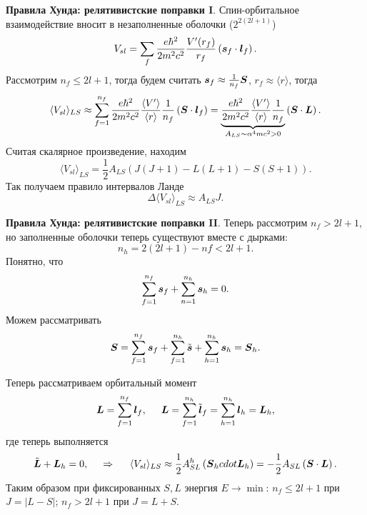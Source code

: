 \textbf{Правила Хунда: релятивистские поправки I}. Спин-орбитальное взаимодействие вносит в незаполненные оболочки ($2^{2(2l +1)}$) 
\begin{equation*}
	V_{sl} = \sum_f \frac{e \hbar^2}{2 m^2 c^2} \frac{V'(r_f)}{r_f} \left(
		\mbox{\boldmath $s$}_f \cdot \mbox{\boldmath $l$}_f
	\right).
\end{equation*}
Рассмотрим $n_f \leq 2 l +1$, тогда будем считать $\mbox{\boldmath $s$}_f \approx	\frac{1}{n_f} \mbox{\boldmath $S$}$, $r_f \approx \langle r\rangle$, тогда
\begin{equation*}
	\langle V_{sl}\rangle_{LS} \approx	
	\sum_{f=1}^{n_f} \frac{e \hbar^2}{2 m^2 c^2} \frac{\langle V'\rangle}{\langle r\rangle} \frac{1}{n_f} \left(\mbox{\boldmath $S$} \cdot \mbox{\boldmath $l$}_f\right) = 
	\underbrace{\frac{e \hbar^2}{2 m^2 c^2} \frac{\langle V'\rangle}{\langle r\rangle} \frac{1}{n_f}}_{A_{LS} \sim \alpha^4 m c^2 > 0} \left(\mbox{\boldmath $S$} \cdot \mbox{\boldmath $L$}\right).
\end{equation*}
Считая скалярное произведение, находим
\begin{equation*}
	\langle V_{sl}\rangle_{LS} = \frac{1}{2} A_{LS} \left(
		J(J+1) - L(L+1) - S (S+1)
	\right).
\end{equation*}
Так получаем правило интервалов Ланде
\begin{equation*}
	\Delta \langle V_{sl}\rangle_{LS} \approx A_{LS} J.
\end{equation*}




\textbf{Правила Хунда: релятивистские поправки II}. Теперь рассмотрим $n_f > 2 l + 1$, но заполненные оболочки теперь существуют вместе с дырками:
\begin{equation*}
	n_h = 2(2 l + 1) -n f  < 2 l +1.
\end{equation*}
Понятно, что
\begin{equation*}
	\sum_{f=1}^{n_f} \mbox{\boldmath $s$}_f + \sum_{n=1}^{n_h} \mbox{\boldmath $s$}_h = 0.
\end{equation*}
Можем рассматривать 
\begin{equation*}
	\mbox{\boldmath $S$} = \sum_{f=1}^{n_f}  \mbox{\boldmath $s$}_f  + \sum_{f=1}^{n_h} \tilde{\mbox{\boldmath $s$}} + \sum_{h=1}^{n_h} \mbox{\boldmath $s$}_h	= \mbox{\boldmath $S$}_h.
\end{equation*}

Теперь рассматриваем орбитальный момент
\begin{equation*}
	\mbox{\boldmath $L$} = \sum_{f=1}^{n_f} \mbox{\boldmath $l$}_f,
	\hspace{5 mm} 
	\mbox{\boldmath $L$} = \sum_{f=1}^{n_h} \tilde{\mbox{\boldmath $l$}}_f	= \sum_{h=1}^{n_h} \mbox{\boldmath $l$}_h = \mbox{\boldmath $L$}_h,
\end{equation*}
где теперь выполняется
\begin{equation*}
	\tilde{\mbox{\boldmath $L$}} + \mbox{\boldmath $L$}_h = 0,
	\hspace{0.5cm} \Rightarrow \hspace{0.5cm}	
	\langle V_{sl}\rangle_{LS} \approx \frac{1}{2} A_{SL}^h \left(\mbox{\boldmath $S$}_h cdot \mbox{\boldmath $L$}_h\right) = - \frac{1}{2} A_{SL} \left(\mbox{\boldmath $S$} \cdot \mbox{\boldmath $L$}\right).
\end{equation*}
Таким образом при фиксированных $S, L$ энергия $E\to \min$:
$n_f \leq 2l+1$ при $J = |L-S|$;
$n_f > 2l+1$ при $J = L+S$.





